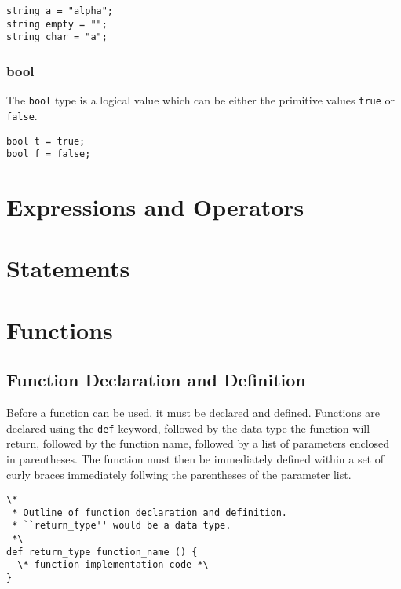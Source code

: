 \documentclass{article}
\newcommand{\code}[1]{\texttt{#1}} %
\begin{document}
\begin{lstlisting}[language=pltLang, caption=Declaration of ``string'' types., label=lst:string]
string a = "alpha";
string empty = "";
string char = "a";
\end{lstlisting}

\subsubsection{bool}

The \code{bool} type is a logical value which can be either the primitive values \code{true} or \code{false}.

\begin{lstlisting}[language=pltLang, caption=Declaration of ``bool'' types., label=lst:bool]
bool t = true;
bool f = false;
\end{lstlisting}

\section{Expressions and Operators}

\section{Statements}

\section{Functions}

\subsection{Function Declaration and Definition}

Before a function can be used, it must be declared and defined. Functions are declared using the \code{def} keyword, followed by the data type the function will return, followed by the function name, followed by a list of parameters enclosed in parentheses. The function must then be immediately defined within a set of curly braces immediately follwing the parentheses of the parameter list. 

\begin{lstlisting}[language=pltLang, caption=Function declaration and definition., label=lst:funct-def]
\* 
 * Outline of function declaration and definition.
 * ``return_type'' would be a data type.
 *\
def return_type function_name () {
  \* function implementation code *\
}
\end{lstlisting}
\end{document}
